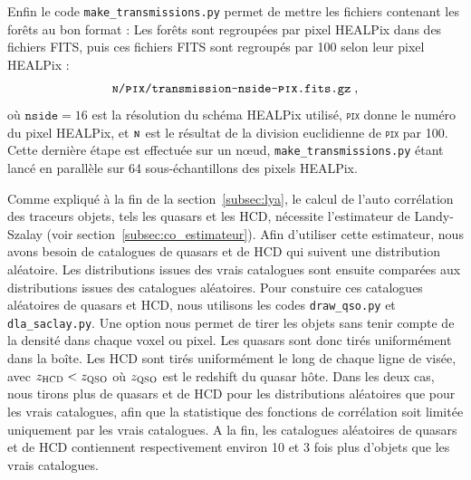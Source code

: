 Enfin le code \texttt{make\_transmissions.py} permet de mettre les fichiers contenant les forêts au bon format :
Les forêts sont regroupées par pixel HEALPix \autocite{Gorski2004} dans des fichiers FITS, puis ces fichiers FITS sont regroupés par 100 selon leur pixel HEALPix :
\begin{equation*}
  \texttt{\textsc{n}/\textsc{pix}/transmission-nside-\textsc{pix}.fits.gz} \; ,
\end{equation*}
où $\texttt{nside} = \num{16}$ est la résolution du schéma HEALPix utilisé, \texttt{\textsc{pix}} donne le numéro du pixel HEALPix, et $\texttt{\textsc{n}}$ est le résultat de la division euclidienne de \texttt{\textsc{pix}} par \num{100}.
Cette dernière étape est effectuée sur un n{\oe}ud, \texttt{make\_transmissions.py} étant lancé en parallèle sur 64 sous-échantillons des pixels HEALPix.

Comme expliqué à la fin de la section~\ref{subsec:lya}, le calcul de l'auto corrélation des traceurs objets, tels les quasars et les HCD, nécessite l'estimateur de Landy-Szalay (voir section~\ref{subsec:co_estimateur}). Afin d'utiliser cette estimateur, nous avons besoin de catalogues de quasars et de HCD qui suivent une distribution aléatoire.
Les distributions issues des vrais catalogues sont ensuite comparées aux distributions issues des catalogues aléatoires.
Pour constuire ces catalogues aléatoires de quasars et HCD, nous utilisons les codes \texttt{draw\_qso.py} et \texttt{dla\_saclay.py}. Une option nous permet de tirer les objets sans tenir compte de la densité dans chaque voxel ou pixel. Les quasars sont donc tirés uniformément dans la boîte. Les HCD sont tirés uniformément le long de chaque ligne de visée, avec $z_{\textsc{HCD}} < z_{\textsc{QSO}}$ où $z_{\textsc{QSO}}$ est le redshift du quasar hôte. Dans les deux cas, nous tirons plus de quasars et de HCD pour les distributions aléatoires que pour les vrais catalogues, afin que la statistique des fonctions de corrélation soit limitée uniquement par les vrais catalogues. A la fin, les catalogues aléatoires de quasars et de HCD contiennent respectivement environ 10 et 3 fois plus d'objets que les vrais catalogues.


